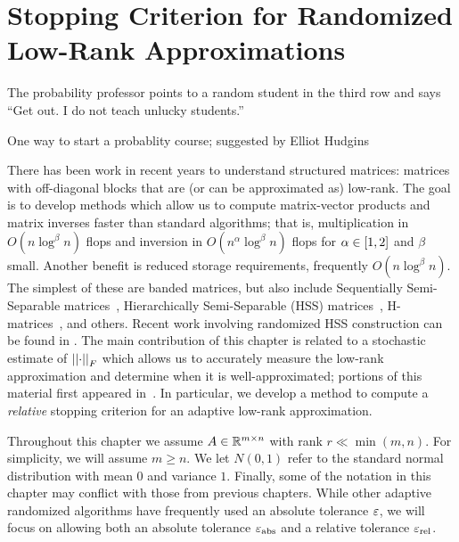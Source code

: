 \chapter{Stopping Criterion for Randomized Low-Rank Approximations}
\label{chap:random}
\epigraph{The probability professor points to a random student
    in the third row and says ``Get out. I do not teach unlucky students.''}{
    One way to start a probablity course; suggested by Elliot Hudgins}

There has been work in recent years to understand
structured matrices: matrices with off-diagonal blocks that
are (or can be approximated as) low-rank.
The goal is to develop methods which allow us to compute
matrix-vector products and matrix inverses faster than
standard algorithms; that is, multiplication in $O(n\log^{\beta}n)$
flops and inversion in $O(n^{\alpha}\log^{\beta}n)$ flops
for $\alpha\in\left[ 1,2 \right]$ and $\beta$ small.
Another benefit is reduced storage requirements,
frequently $O(n\log^{\beta}n)$.
The simplest of these are banded matrices, but also include
Sequentially Semi-Separable matrices~\cite{chandrasekaran2005some},
Hierarchically Semi-Separable (HSS)
matrices~\cite{Chandrasekaran2005HSS,chandrasekaran2006fast},
H-matrices~\cite{hackbusch1999sparse}, and others.
Recent work involving randomized HSS construction can be found in
\cite{martinsson2011fast,rouet2016distributed,ghysels2017robust}.
The main contribution of this chapter is related to
a stochastic estimate of $\left| \left| \cdot \right| \right|_{F}$ which
allows us to accurately measure the low-rank approximation
and determine when it is well-approximated;
portions of this material first appeared in~\cite{randomHSSLBL}.
In particular, we develop a method to compute a \emph{relative}
stopping criterion for an adaptive low-rank approximation.

Throughout this chapter we assume $A\in\mathbb{R}^{m\times n}$
with rank $r\ll \min(m,n)$.
For simplicity, we will assume $m\ge n$.
We let $N(0,1)$ refer to the standard normal distribution
with mean $0$ and variance $1$.
Finally, some of the notation in this chapter may conflict with those
from previous chapters.
While other adaptive randomized algorithms have frequently used
an absolute tolerance $\varepsilon$, we will focus on allowing both
an absolute tolerance $\varepsilon_{\text{abs}}$ and a relative tolerance $\varepsilon_{\text{rel}}$.








